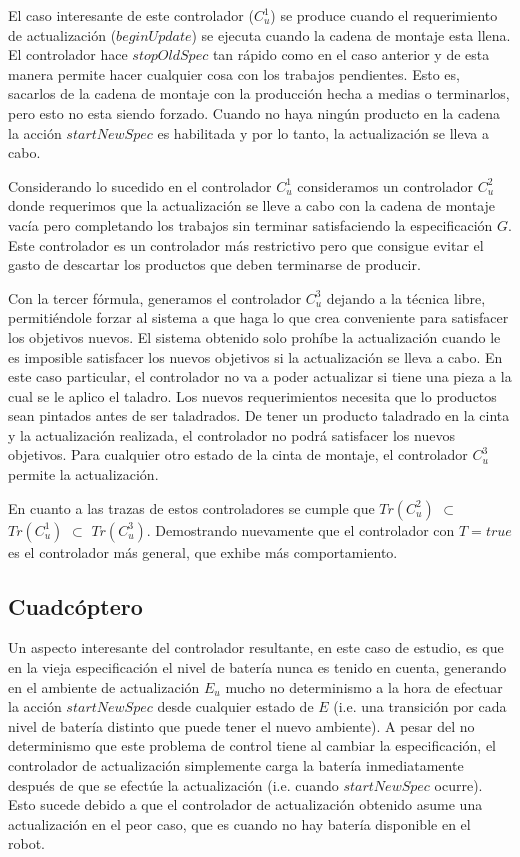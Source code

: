 El caso interesante de este controlador ($C_u^1$) se produce cuando el requerimiento de actualización ($beginUpdate$) se
ejecuta cuando la cadena de montaje esta llena. El controlador hace $stopOldSpec$ tan rápido como en el caso anterior y
de esta manera permite hacer cualquier cosa con los trabajos pendientes. Esto es, sacarlos de la cadena de montaje con
la producción hecha a medias o terminarlos, pero esto no esta siendo forzado. Cuando no haya ningún producto en la
cadena la acción $startNewSpec$ es habilitada y por lo tanto, la actualización se lleva a cabo.

Considerando lo sucedido en el controlador $C_u^1$ consideramos un controlador $C_u^2$ donde requerimos que la
actualización se lleve a cabo con la cadena de montaje vacía pero completando los trabajos sin terminar satisfaciendo la
especificación $G$. Este controlador es un controlador más restrictivo pero que consigue evitar el gasto de descartar
los productos que deben terminarse de producir. 

Con la tercer fórmula, generamos el controlador $C_u^3$ dejando a la técnica libre, permitiéndole forzar al sistema a
que haga lo que crea conveniente para satisfacer los objetivos nuevos. El sistema obtenido solo prohíbe la actualización
cuando le es imposible satisfacer los nuevos objetivos si la actualización se lleva a cabo. En este caso particular, el
controlador no va a poder actualizar si tiene una pieza a la cual se le aplico el taladro. Los nuevos requerimientos
necesita que lo productos sean pintados antes de ser taladrados. De tener un producto taladrado en la cinta y la
actualización realizada, el controlador no podrá satisfacer los nuevos objetivos. Para cualquier otro estado de la cinta
de montaje, el controlador $C_u^3$ permite la actualización.

En cuanto a las trazas de estos controladores se cumple que $Tr(C_u^2)$ $\subset$ $Tr(C_u^1)$ $\subset$ $Tr(C_u^3)$.
Demostrando nuevamente que el controlador con $T = true$ es el controlador más general, que exhibe más comportamiento.

\subsection{Cuadcóptero}

Un aspecto interesante del controlador resultante, en este caso de estudio, es que en la vieja especificación el nivel
de batería nunca es tenido en cuenta, generando en el ambiente de actualización $E_u$ mucho no determinismo a la hora de
efectuar la acción $startNewSpec$ desde cualquier estado de $E$ (i.e. una transición por cada nivel de batería distinto que
puede tener el nuevo ambiente). A pesar del no determinismo que este problema de control tiene al cambiar la
especificación, el controlador de actualización simplemente carga la batería inmediatamente después de que se efectúe la
actualización (i.e. cuando $startNewSpec$ ocurre). Esto sucede debido a que el controlador de actualización obtenido
asume una actualización en el peor caso, que es cuando no hay batería disponible en el robot.


